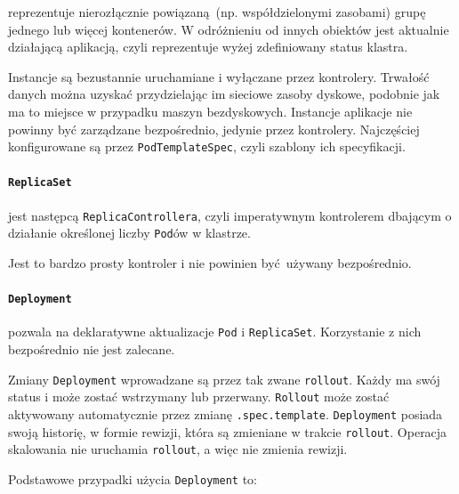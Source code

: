 \documentclass[a4paper,12pt,twoside,openany]{report}
\newcommand{\passthrough}[1]{#1}
\begin{document}
reprezentuje nierozłącznie powiązaną~(np. współdzielonymi zasobami)
grupę jednego lub więcej kontenerów. W odróżnieniu od innych obiektów
jest aktualnie działającą aplikacją, czyli reprezentuje wyżej
zdefiniowany status klastra.

Instancje są bezustannie uruchamiane i wyłączane przez kontrolery.
Trwałość danych można uzyskać przydzielając im sieciowe zasoby dyskowe,
podobnie jak ma to miejsce w przypadku maszyn bezdyskowych. Instancje
aplikacje nie powinny być zarządzane bezpośrednio, jedynie przez
kontrolery. Najczęściej konfigurowane są przez
\passthrough{\lstinline!PodTemplateSpec!}, czyli szablony ich
specyfikacji.

\hypertarget{replicaset}{%
\paragraph{\texorpdfstring{\texttt{ReplicaSet}}{ReplicaSet}}\label{replicaset}}

jest następcą \passthrough{\lstinline!ReplicaControllera!}, czyli
imperatywnym kontrolerem dbającym o działanie określonej liczby
\passthrough{\lstinline!Pod!}ów w klastrze.

Jest to bardzo prosty kontroler i nie powinien być~używany bezpośrednio.

\hypertarget{deployment}{%
\paragraph{\texorpdfstring{\texttt{Deployment}}{Deployment}}\label{deployment}}

pozwala na deklaratywne aktualizacje \passthrough{\lstinline!Pod!} i
\passthrough{\lstinline!ReplicaSet!}. Korzystanie z nich bezpośrednio
nie jest zalecane.

Zmiany \passthrough{\lstinline!Deployment!} wprowadzane są przez tak
zwane \passthrough{\lstinline!rollout!}. Każdy ma swój status i może
zostać wstrzymany lub przerwany. \passthrough{\lstinline!Rollout!} może
zostać aktywowany automatycznie przez zmianę
\passthrough{\lstinline!.spec.template!}.
\passthrough{\lstinline!Deployment!} posiada swoją historię, w formie
rewizji, która są zmieniane w trakcie \passthrough{\lstinline!rollout!}.
Operacja skalowania nie uruchamia \passthrough{\lstinline!rollout!}, a
więc nie zmienia rewizji.

Podstawowe przypadki użycia \passthrough{\lstinline!Deployment!} to:
\end{document}
